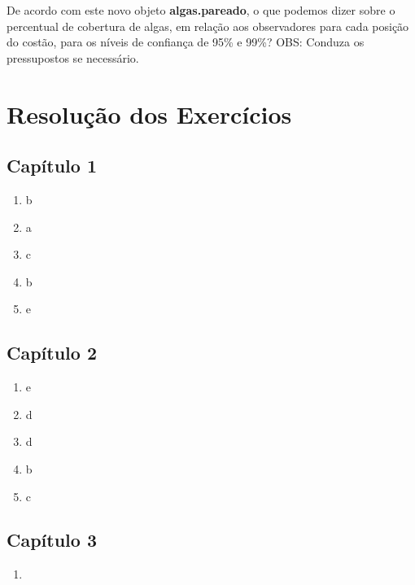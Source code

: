 \documentclass[14pt,titlepage, oneside, openany, a4paper]{book}
\providecommand{\tightlist}{%
  \setlength{\itemsep}{0pt}\setlength{\parskip}{0pt}}
\begin{document}
De acordo com este novo objeto \textbf{algas.pareado}, o que podemos dizer sobre o percentual de cobertura de algas, em relação aos observadores para cada posição do costão, para os níveis de confiança de 95\% e 99\%?
OBS: Conduza os pressupostos se necessário.

\hypertarget{appendix-appendix}{%
\appendix}


\hypertarget{resoluuxe7uxe3o-dos-exercuxedcios}{%
\chapter{Resolução dos Exercícios}\label{resoluuxe7uxe3o-dos-exercuxedcios}}

\hypertarget{capuxedtulo-1}{%
\section{Capítulo 1}\label{capuxedtulo-1}}

\begin{enumerate}
\def\labelenumi{\arabic{enumi})}
\tightlist
\item
  b
\item
  a
\item
  c
\item
  b
\item
  e
\end{enumerate}

\hypertarget{capuxedtulo-2}{%
\section{Capítulo 2}\label{capuxedtulo-2}}

\begin{enumerate}
\def\labelenumi{\arabic{enumi})}
\tightlist
\item
  e
\item
  d
\item
  d
\item
  b
\item
  c
\end{enumerate}

\hypertarget{capuxedtulo-3}{%
\section{Capítulo 3}\label{capuxedtulo-3}}

\begin{enumerate}
\def\labelenumi{\arabic{enumi})}
\item
\end{enumerate}
\end{document}
